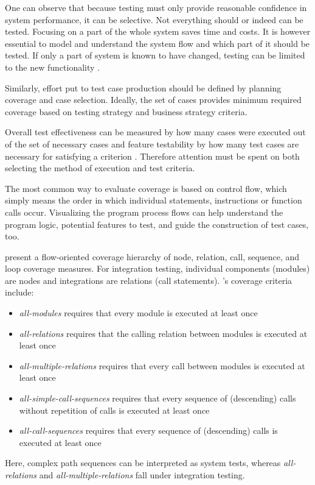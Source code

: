 \documentclass[12pt,a4paper,oneside,pdftex]{report}
\begin{document}
One can observe that because testing must only provide reasonable confidence in system performance, it can be selective. Not everything should or indeed can be tested. Focusing on a part of the whole system saves time and costs. It is however essential to model and understand the system flow and which part of it should be tested. If only a part of system is known to have changed, testing can be limited to the new functionality \citep{bhuyan2012survey}. 

Similarly, effort put to test case production should be defined by planning coverage and case selection. Ideally, the set of cases provides minimum required coverage based on testing strategy and business strategy criteria. 

Overall test effectiveness can be measured by how many cases were executed out of the set of necessary cases and feature testability by how many test cases are necessary for satisfying a criterion \citep{linnenkugel1990test}. Therefore attention must be spent on both selecting the method of execution and test criteria. 

The most common way to evaluate coverage is based on control flow, which simply means the order in which individual statements, instructions or function calls occur. Visualizing the program process flows can help understand the program logic, potential features to test, and guide the construction of test cases, too. \citep{burnstein2003practical} 

\citet{linnenkugel1990test} present a flow-oriented coverage hierarchy of node, relation, call, sequence, and loop coverage measures. For integration testing, individual components (modules) are nodes and integrations are relations (call statements). \citeauthor{linnenkugel1990test}'s \citeyearpar{linnenkugel1990test} coverage criteria include:
\begin{itemize}
\item \emph{all-modules} requires that every module is executed at least once 
\item \emph{all-relations} requires that the calling relation between modules is executed at least once
\item \emph{all-multiple-relations} requires that every call between modules is executed at least once
\item \emph{all-simple-call-sequences} requires that every sequence of (descending) calls without repetition of calls is executed at least once
\item \emph{all-call-sequences} requires that every sequence of (descending) calls is executed at least once
\end{itemize}
Here, complex path sequences can be interpreted as system tests, whereas \emph{all-relations} and \emph{all-multiple-relations} fall under integration testing.
\end{document}
